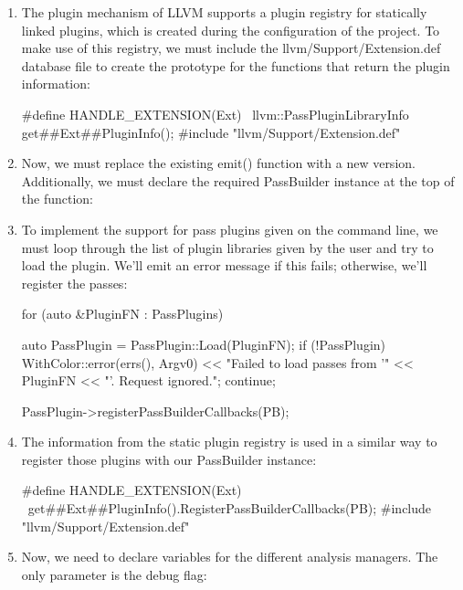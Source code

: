 \begin{enumerate}
\item
The plugin mechanism of LLVM supports a plugin registry for statically linked plugins, which is created during the configuration of the project. To make use of this registry, we must include the llvm/Support/Extension.def database file to create the prototype for the functions that return the plugin information:

\begin{cpp}
#define HANDLE_EXTENSION(Ext) \
    llvm::PassPluginLibraryInfo get##Ext##PluginInfo();
#include "llvm/Support/Extension.def"
\end{cpp}

\item
Now, we must replace the existing emit() function with a new version. Additionally, we must declare the required PassBuilder instance at the top of the function:

\begin{cpp}
bool emit(StringRef Argv0, llvm::Module *M,
          llvm::TargetMachine *TM,
          StringRef InputFilename) {
    PassBuilder PB(TM);
\end{cpp}

\item
To implement the support for pass plugins given on the command line, we must loop through the list of plugin libraries given by the user and try to load the plugin. We’ll emit an error message if this fails; otherwise, we’ll register the passes:

\begin{cpp}
for (auto &PluginFN : PassPlugins) {
    auto PassPlugin = PassPlugin::Load(PluginFN);
    if (!PassPlugin) {
        WithColor::error(errs(), Argv0)
            << "Failed to load passes from '" << PluginFN
            << "'. Request ignored.\n";
        continue;
    }

    PassPlugin->registerPassBuilderCallbacks(PB);
}
\end{cpp}

\item
The information from the static plugin registry is used in a similar way to register those plugins with our PassBuilder instance:

\begin{cpp}
#define HANDLE_EXTENSION(Ext) \
    get##Ext##PluginInfo().RegisterPassBuilderCallbacks(PB);
#include "llvm/Support/Extension.def"
\end{cpp}

\item
Now, we need to declare variables for the different analysis managers. The only parameter is the debug flag:


\end{enumerate}
